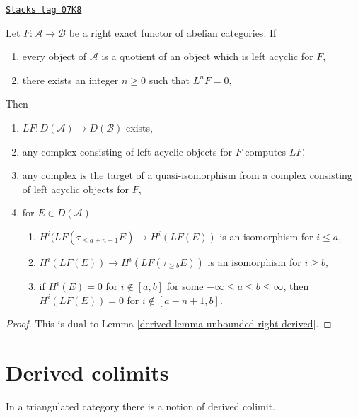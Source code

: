 \begin{lemma}
\label{derived-lemma-unbounded-left-derived}
\href{https://stacks.math.columbia.edu/tag/07K8}{\texttt{Stacks tag 07K8}}

Let $F : \mathcal{A} \to \mathcal{B}$ be a right exact functor of
abelian categories. If
\begin{enumerate}
\item every object of $\mathcal{A}$ is a quotient of an object
which is left acyclic for $F$,
\item there exists an integer $n \geq 0$ such that $L^nF = 0$,
\end{enumerate}
Then
\begin{enumerate}
\item $LF : D(\mathcal{A}) \to D(\mathcal{B})$ exists,
\item any complex consisting of left acyclic objects for $F$ computes $LF$,
\item any complex is the target of a quasi-isomorphism from a complex
consisting of left acyclic objects for $F$,
\item for $E \in D(\mathcal{A})$
\begin{enumerate}
\item $H^i(LF(\tau_{\leq a + n - 1}E) \to H^i(LF(E))$ is an isomorphism
for $i \leq a$,
\item $H^i(LF(E)) \to H^i(LF(\tau_{\geq b}E))$ is an isomorphism
for $i \geq b$,
\item if $H^i(E) = 0$ for $i \not \in [a, b]$ for some
$-\infty \leq a \leq b \leq \infty$, then $H^i(LF(E)) = 0$
for $i \not \in [a - n + 1, b]$.
\end{enumerate}
\end{enumerate}
\end{lemma}

\begin{proof}

This is dual to Lemma \ref{derived-lemma-unbounded-right-derived}.
\end{proof}

\section{Derived colimits}
\label{derived-section-derived-colimit}
In a triangulated category there is a notion of derived colimit.

